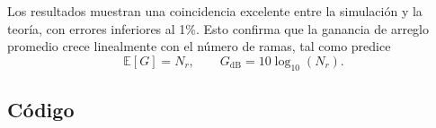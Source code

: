 \documentclass[11pt]{article}
\begin{document}
Los resultados muestran una coincidencia excelente entre la simulación y la teoría, con errores inferiores al 1\%.  
Esto confirma que la ganancia de arreglo promedio crece linealmente con el número de ramas, tal como predice
\[
\mathbb{E}[G] = N_r, \qquad G_{\text{dB}} = 10 \log_{10}(N_r).
\]

\subsection*{Código}


\end{document}
